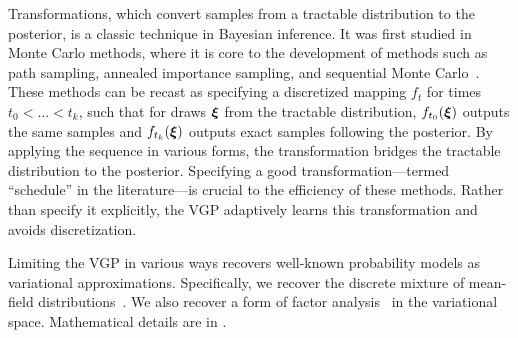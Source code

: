 Transformations, which convert samples from a tractable distribution
to the posterior, is a classic technique in Bayesian inference. It was
first studied in Monte Carlo methods, where it is core to the
development of methods such as path sampling, annealed importance
sampling, and sequential Monte
Carlo~\citep{gelman1998simulating,neal1998annealed,chopin2002sequential}.
These methods can be recast as specifying a discretized mapping
$f_t$ for times $t_0<\ldots<t_k$, such that for draws $\boldsymbol{\mathbf{\xi}}$ from the
tractable distribution, $f_{t_0}(\boldsymbol{\mathbf{\xi}})$ outputs the same samples and
$f_{t_k}(\boldsymbol{\mathbf{\xi}})$ outputs exact samples following the posterior.  By
applying the sequence in various forms,
the transformation bridges the tractable distribution to the
posterior.  Specifying a good transformation---termed ``schedule'' in
the literature---is crucial to the efficiency of these methods. Rather than specify it
explicitly, the
\gls{VGP} adaptively learns this transformation and avoids
discretization.

Limiting the \gls{VGP} in various ways recovers well-known probability models
as variational approximations. Specifically,
we recover the discrete mixture of mean-field
distributions~\citep{bishop1998approximating,jaakola1998improving}.
We also recover a form of factor analysis~\citep{tipping1999probabilistic} in
the variational space. Mathematical details are in
.








